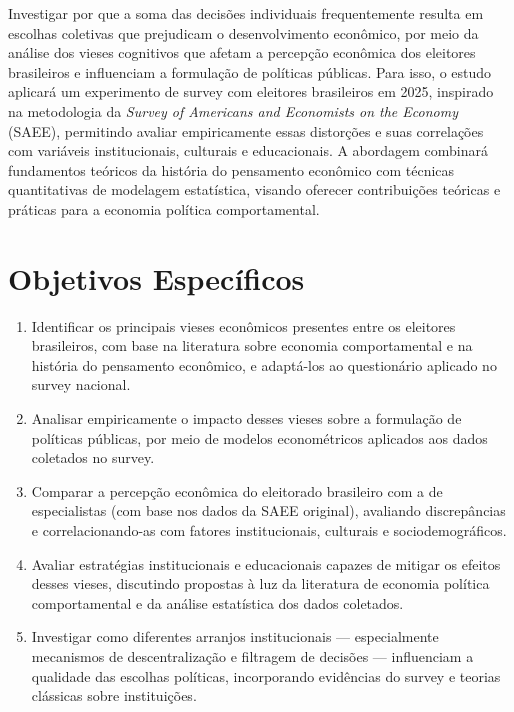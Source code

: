 Investigar por que a soma das decisões individuais frequentemente resulta em escolhas coletivas que prejudicam o desenvolvimento econômico, por meio da análise dos vieses cognitivos que afetam a percepção econômica dos eleitores brasileiros e influenciam a formulação de políticas públicas. Para isso, o estudo aplicará um experimento de survey com eleitores brasileiros em 2025, inspirado na metodologia da \textit{Survey of Americans and Economists on the Economy} (SAEE), permitindo avaliar empiricamente essas distorções e suas correlações com variáveis institucionais, culturais e educacionais. A abordagem combinará fundamentos teóricos da história do pensamento econômico com técnicas quantitativas de modelagem estatística, visando oferecer contribuições teóricas e práticas para a economia política comportamental.

\section{Objetivos Específicos}

\begin{enumerate}[label=\alph*)]
    \item Identificar os principais vieses econômicos presentes entre os eleitores brasileiros, com base na literatura sobre economia comportamental e na história do pensamento econômico, e adaptá-los ao questionário aplicado no survey nacional.
    \item Analisar empiricamente o impacto desses vieses sobre a formulação de políticas públicas, por meio de modelos econométricos aplicados aos dados coletados no survey.
    \item Comparar a percepção econômica do eleitorado brasileiro com a de especialistas (com base nos dados da SAEE original), avaliando discrepâncias e correlacionando-as com fatores institucionais, culturais e sociodemográficos.
    \item Avaliar estratégias institucionais e educacionais capazes de mitigar os efeitos desses vieses, discutindo propostas à luz da literatura de economia política comportamental e da análise estatística dos dados coletados.
    \item Investigar como diferentes arranjos institucionais — especialmente mecanismos de descentralização e filtragem de decisões — influenciam a qualidade das escolhas políticas, incorporando evidências do survey e teorias clássicas sobre instituições.
\end{enumerate}

